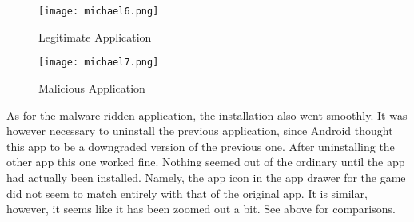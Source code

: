 ~\\
~\\
~\\
~\\
~\\
~\\
~\\
~\\
~\\
~\\
~\\
~\\
~\\
~\\
~\\
~\\
~\\
~\\
~\\
~\\
~\\
~\\
~\\
~\\
~\\
~\\
~\\

\newpage

\begin{figure}
\centering
\begin{minipage}{.5\textwidth}
  \centering
  \texttt{[image: michael6.png]}
  \caption{Legitimate Application}
  \label{fig:test1}
\end{minipage}%
\begin{minipage}{.5\textwidth}
  \centering
  \texttt{[image: michael7.png]}
  \caption{Malicious Application}
  \label{fig:test2}
\end{minipage}
\end{figure}

As for the malware-ridden application, the installation also went smoothly. It was however necessary to uninstall the previous application, since Android thought this app to be a downgraded version of the previous one. After uninstalling the other app this one worked fine. Nothing seemed out of the ordinary until the app had actually been installed. Namely, the app icon in the app drawer for the game did not seem to match entirely with that of the original app. It is similar, however, it seems like it has been zoomed out a bit. See above for comparisons.

